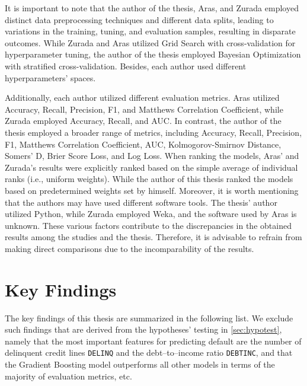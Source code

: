 It is important to note that the author of the thesis, Aras, and Zurada employed distinct data preprocessing techniques and different data splits, leading to variations in the training, tuning, and evaluation samples, resulting in disparate outcomes.
While Zurada and Aras utilized Grid Search with cross-validation for hyperparameter tuning, the author of the thesis employed Bayesian Optimization with stratified cross-validation. Besides, each author used different hyperparameters' spaces.

Additionally, each author utilized different evaluation metrics. Aras utilized Accuracy, Recall, Precision, F1, and Matthews Correlation Coefficient, while Zurada employed Accuracy, Recall, and AUC.
In contrast, the author of the thesis employed a broader range of metrics, including Accuracy, Recall, Precision, F1, Matthews Correlation Coefficient, AUC, Kolmogorov-Smirnov Distance, Somers' D, Brier Score Loss, and Log Loss.
When ranking the models, Aras' and Zurada's results were explicitly ranked based on the simple average of individual ranks (i.e., uniform weights). While the author of this thesis ranked the models based on predetermined weights set by himself.
Moreover, it is worth mentioning that the authors may have used different software tools. The thesis' author utilized Python, while Zurada employed Weka, and the software used by Aras is unknown.
These various factors contribute to the discrepancies in the obtained results among the studies and the thesis. Therefore, it is advisable to refrain from making direct comparisons due to the incomparability of the results.
\vspace{0.3cm}

\newpage
\section{Key Findings}
\label{sec:keyfindings}
The key findings of this thesis are summarized in the following list. We exclude such findings that are derived from the hypotheses' testing in \autoref{sec:hypotest}, namely that the most important features for predicting default are the number of delinquent credit lines \texttt{DELINQ} and the debt--to--income ratio \texttt{DEBTINC}, and that the Gradient Boosting model outperforms all other models in terms of the majority of evaluation metrics, etc.

